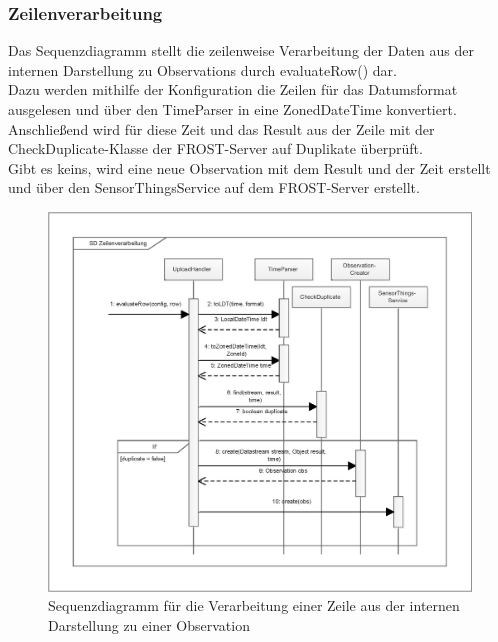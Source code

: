 \subsubsection{Zeilenverarbeitung}\label{verarbeitung}

Das Sequenzdiagramm stellt die zeilenweise Verarbeitung der Daten aus der internen Darstellung zu Observations durch evaluateRow() dar.\\
Dazu werden mithilfe der Konfiguration die Zeilen für das Datumsformat ausgelesen und über den TimeParser in eine ZonedDateTime konvertiert.\\
Anschließend wird für diese Zeit und das Result aus der Zeile mit der CheckDuplicate-Klasse der FROST-Server auf Duplikate überprüft.\\
Gibt es keins, wird eine neue Observation mit dem Result und der Zeit erstellt und über den SensorThingsService auf dem FROST-Server erstellt.

\vspace{\fill}
\begin{figure}[htbp]
\centering
\includegraphics[scale=0.6]{uml/SD_row.eps}
\caption{Sequenzdiagramm für die Verarbeitung einer Zeile aus der internen Darstellung zu einer Observation}
\end{figure}
\vspace{\fill}

\clearpage
